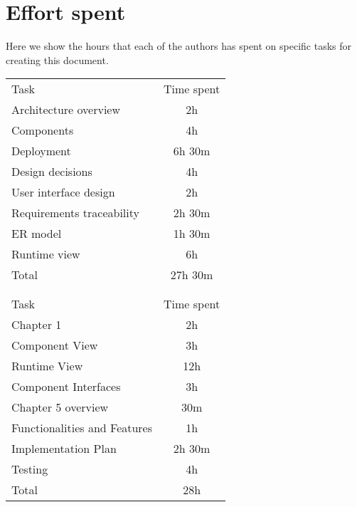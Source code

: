 \chapter{Effort spent}
Here we show the hours that each of the authors has spent on specific tasks
for creating this document.

\vspace{\baselineskip}\noindent
{
    \sffamily
    \begin{tabu} to \linewidth {l c}
        \rowfont{\bfseries}
         \\
        \toprule
        \rowfont{\bfseries}
        Task & Time spent \\
        \midrule
        Architecture overview & 2h \\
        Components & 4h \\
        Deployment & 6h 30m \\
        Design decisions & 4h \\
        User interface design & 2h \\
        Requirements traceability & 2h 30m \\
        ER model & 1h 30m \\
        Runtime view & 6h \\
        \bottomrule
        \rowfont{\bfseries}
        Total & 27h 30m \\
        \\
        \rowfont{\bfseries}
         \\
        \toprule
        \rowfont{\bfseries}
        Task & Time spent \\
        \midrule
        Chapter 1 & 2h \\
        Component View & 3h \\
        Runtime View & 12h \\
        Component Interfaces & 3h \\
        Chapter 5 overview & 30m \\
        Functionalities and Features & 1h \\
        Implementation Plan & 2h 30m \\
        Testing & 4h \\
        \bottomrule
        \rowfont{\bfseries}
        Total & 28h
    \end{tabu}
}